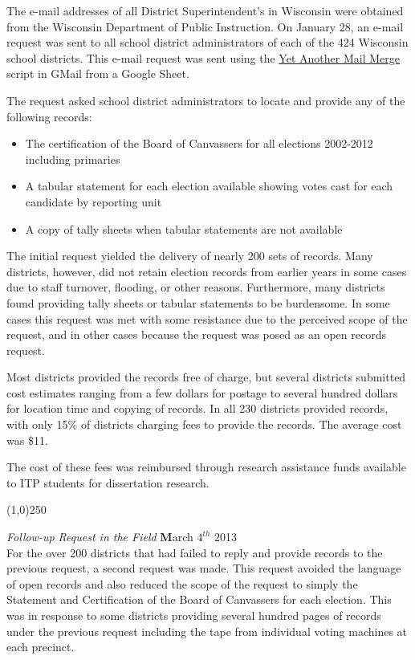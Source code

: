 The e-mail addresses of all District Superintendent's in Wisconsin were obtained 
from the Wisconsin Department of Public Instruction. On January 28, an e-mail request 
was sent to all school district administrators of each of the 424 Wisconsin 
school districts. This e-mail request was sent using the 
\href{https://sites.google.com/site/scriptsexamples/available-web-apps/mail-merge}{Yet Another Mail Merge} script in GMail from a Google Sheet. 

The request asked school district administrators to locate and provide any of the following records:

\begin{itemize}
\item The certification of the Board of Canvassers for all elections 2002-2012 including primaries
\item A tabular statement for each election available showing votes cast for each candidate by reporting unit
\item A copy of tally sheets when tabular statements are not available
\end{itemize}

The initial request yielded the delivery of nearly 200 sets of records. Many districts, however, 
did not retain election records from earlier years in some cases due to staff turnover, flooding, or 
other reasons. Furthermore, many districts found providing tally sheets or tabular statements to be 
burdensome. In some cases this request was met with some resistance due to the perceived scope of 
the request, and in other cases because the request was posed as an open records request. 

Most districts provided the records free of charge, but several districts submitted cost 
estimates ranging from a few dollars for postage to several hundred dollars for location time 
and copying of records. In all 230 districts provided records, with only 15\% of districts 
charging fees to provide the records. The average cost was \$11. 

The cost of these fees was reimbursed through research assistance funds available to 
ITP students for dissertation research. 

\begin{center}
\line(1,0){250}
\end{center}

{\em Follow-up Request in the Field} \hfill {\textbf March $4^{th}$ 2013}\\

For the over 200 districts that had failed to reply and provide records to the previous 
request, a second request was made. This request avoided the language of open records and 
also reduced the scope of the request to simply the Statement and Certification of the Board 
of Canvassers for each election. This was in response to some districts providing several 
hundred pages of records under the previous request including the tape from individual 
voting machines at each precinct. 

